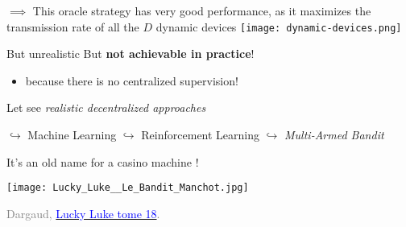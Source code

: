 \begin{frameO}

    \begin{colorblock}{}
        \(\implies\) This oracle strategy has very good performance, as it maximizes the transmission rate of all the \(D\) dynamic devices
        \texttt{[image: dynamic-devices.png]}
    \end{colorblock}

    \begin{colorblock}{But unrealistic}
        But \textbf{not achievable in practice}!
        \begin{itemize}
            \item \alert{because there is no centralized supervision!}
        \end{itemize}
    \end{colorblock}

    \vspace*{30pt}

    \begin{colorblock}{Let see \emph{realistic decentralized approaches}}

        \(\hookrightarrow\) Machine Learning \newline
        \hspace*{15pt}\(\hookrightarrow\) Reinforcement Learning \newline
        \hspace*{30pt} \(\hookrightarrow\) \emph{Multi-Armed Bandit}

    \end{colorblock}

\end{frameO}



\begin{frameO}
    \begin{center}
        It's an old name for a casino machine \slotmachine{} !
    \end{center}

    \begin{center}
        \texttt{[image: Lucky\_Luke\_\_Le\_Bandit\_Manchot.jpg]}

        \begin{tiny}
            \textcolor{gray}{
                \textcopyright{} Dargaud,
                \href{https://www.dargaud.com/bd/LUCKY-LUKE/Lucky-Luke/Lucky-Luke-tome-18-Bandit-manchot-Le}{\textcolor{blue}{Lucky Luke tome 18}}.
            }
        \end{tiny}
    \end{center}
\end{frameO}




